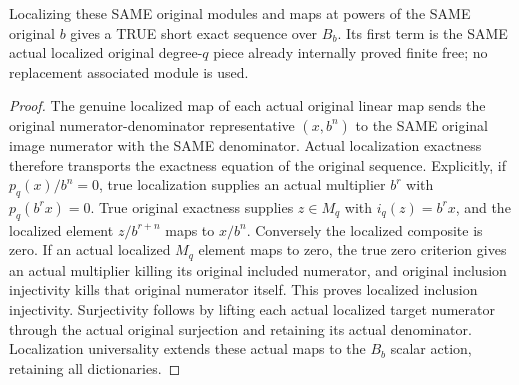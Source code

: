 \begin{theorem}
\label{hir:relative-normal-uniformtrunc-localized-short-exact}
\leanok
{}
Localizing these SAME original modules and maps at powers of the SAME
original $b$ gives a TRUE short exact sequence over $B_b$. Its first term
is the SAME actual localized original degree-$q$ piece already internally
proved finite free; no replacement associated module is used.
\end{theorem}
\begin{proof}
The genuine localized map of each actual original linear map sends the
original numerator-denominator representative $(x,b^n)$ to the SAME
original image numerator with the SAME denominator. Actual localization
exactness therefore transports the exactness equation of the original
sequence. Explicitly, if $p_q(x)/b^n=0$, true localization supplies an
actual multiplier $b^r$ with $p_q(b^r x)=0$. True original exactness supplies
$z\in M_q$ with $i_q(z)=b^r x$, and the localized element $z/b^{r+n}$
maps to $x/b^n$. Conversely the localized composite is zero. If an actual
localized $M_q$ element maps to zero, the true zero criterion gives an
actual multiplier killing its original included numerator, and original
inclusion injectivity kills that original numerator itself. This proves
localized inclusion injectivity. Surjectivity follows by lifting each
actual localized target numerator through the actual original surjection
and retaining its actual denominator. Localization universality extends
these actual maps to the $B_b$ scalar action, retaining all dictionaries.
\end{proof}

